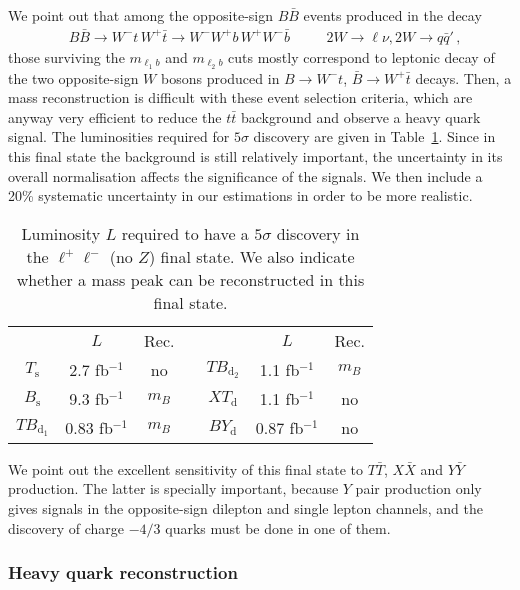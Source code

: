 \documentclass[12pt,a4paper]{article}
\newcommand{\fbin}{fb$^{-1}$}
\newcommand{\TT}{T \bar T}
\newcommand{\BB}{B \bar B}
\newcommand{\XX}{X \bar X}
\newcommand{\YY}{Y \bar Y}
\newcommand{\Ts}{T_\text{s}}
\newcommand{\Bs}{B_\text{s}}
\newcommand{\TBd}{TB_{\text{d}_1}}
\newcommand{\TBD}{TB_{\text{d}_2}}
\newcommand{\XTd}{XT_\text{d}}
\newcommand{\BYd}{BY_\text{d}}
\begin{document}
%
We point out that among the opposite-sign $\BB$ events produced in the decay
\begin{align}
& B \bar B \to W^- t \, W^+ \bar t \to W^- W^+ b \, W^+ W^- \bar b
&& \quad 2W \to \ell \nu , 2W \to q \bar q' \,,
\label{ec:BBdec}
\end{align}
those surviving the $m_{\ell_1 b}$ and $m_{\ell_2 b}$ cuts mostly correspond to leptonic decay of the two opposite-sign $W$ bosons produced in $B \to W^- t$, $\bar B \to W^+ \bar t$ decays. Then, a mass reconstruction is difficult with these event selection criteria, which are anyway very efficient to reduce the $t \bar t$ background and observe a heavy quark signal.
The luminosities required for $5\sigma$ discovery are given in Table~\ref{tab:sig-2Q0-noZ}. Since in this final state the background is still relatively important, the uncertainty in its overall normalisation affects the significance of the signals. We then include a 20\% systematic uncertainty in our estimations in order to be more realistic.
%
\begin{table}[t]
\begin{center}
\begin{tabular}{ccccccc}
       & $L$        & Rec. & \quad &        & $L$       & Rec. \\[1mm]
$\Ts$  & 2.7 \fbin  & no   &       & $\TBD$ & 1.1 \fbin & $m_B$ \\
$\Bs$  & 9.3 \fbin  & $m_B$   &       & $\XTd$ & 1.1 \fbin & no \\
$\TBd$ & 0.83 \fbin & $m_B$   &       & $\BYd$ & 0.87 \fbin    & no \\
\end{tabular}
\end{center}
\caption{Luminosity $L$ required to have a $5\sigma$ discovery in the $\ell^+ \ell^-$ (no $Z$) final state. We also indicate whether a mass peak can be reconstructed in this final state.}
\label{tab:sig-2Q0-noZ}
\end{table}
%
We point out the excellent sensitivity of this final state to $\TT$, $\XX$ and $\YY$ production. The latter is specially important, because $Y$ pair production only gives signals in the opposite-sign dilepton and single lepton channels, and the discovery of charge $-4/3$ quarks must be done in one of them.

\subsubsection{Heavy quark reconstruction}
\end{document}

